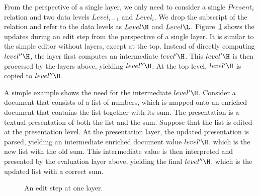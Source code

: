 From the perspective of a single layer, we only need to consider a single $Present_i$ relation and two data levels $Level_{i-1}$ and $Level_{i}$. We drop the subscript of the relation and refer to the data levels as $Level\H$ and $Level\L$. Figure~\ref{layerEditProcess} shows the updates during an edit step from the perspective of a single layer. It is similar to the simple editor without layers, except at the top. Instead of directly computing $level''\H$, the layer first computes an intermediate $level'\H$. This $level'\H$ is then processed by the layers above, yielding $level''\H$. At the top level, $level'\H$ is copied to $level''\H$.   



A simple example shows the need for the intermediate $level'\H$. Consider a document that consists of a list of numbers, which is mapped onto an enriched document that contains the list together with its sum. The presentation is a textual presentation of both the list and the sum. Suppose that the list is edited at the presentation level. At the presentation layer, the updated presentation is parsed, yielding an intermediate enriched document value $level'\H$, which is the new list with the old sum. This intermediate value is then interpreted and presented by the evaluation layer above, yielding the final $level''\H$, which is the updated list with a correct sum.

\begin{figure}
\begin{small}
\begin{center}
\begin{center}
\end{center}\caption{An edit step at one layer.}\label{layerEditProcess} 
\end{center}
\end{small}
\end{figure}

